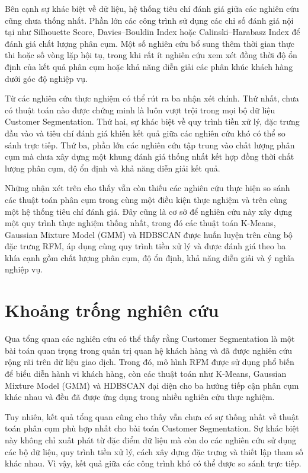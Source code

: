 \documentclass[12pt]{ai_conquer2026}
\begin{document}
Bên cạnh sự khác biệt về dữ liệu, hệ thống tiêu chí đánh giá giữa các nghiên cứu cũng chưa thống nhất. Phần lớn các công trình sử dụng các chỉ số đánh giá nội tại như Silhouette Score, Davies--Bouldin Index hoặc Calinski--Harabasz Index để đánh giá chất lượng phân cụm. Một số nghiên cứu bổ sung thêm thời gian thực thi hoặc số vòng lặp hội tụ, trong khi rất ít nghiên cứu xem xét đồng thời độ ổn định của kết quả phân cụm hoặc khả năng diễn giải các phân khúc khách hàng dưới góc độ nghiệp vụ.

Từ các nghiên cứu thực nghiệm có thể rút ra ba nhận xét chính. Thứ nhất, chưa có thuật toán nào được chứng minh là luôn vượt trội trong mọi bộ dữ liệu Customer Segmentation. Thứ hai, sự khác biệt về quy trình tiền xử lý, đặc trưng đầu vào và tiêu chí đánh giá khiến kết quả giữa các nghiên cứu khó có thể so sánh trực tiếp. Thứ ba, phần lớn các nghiên cứu tập trung vào chất lượng phân cụm mà chưa xây dựng một khung đánh giá thống nhất kết hợp đồng thời chất lượng phân cụm, độ ổn định và khả năng diễn giải kết quả.

Những nhận xét trên cho thấy vẫn còn thiếu các nghiên cứu thực hiện so sánh các thuật toán phân cụm trong cùng một điều kiện thực nghiệm và trên cùng một hệ thống tiêu chí đánh giá. Đây cũng là cơ sở để nghiên cứu này xây dựng một quy trình thực nghiệm thống nhất, trong đó các thuật toán K-Means, Gaussian Mixture Model (GMM) và HDBSCAN được huấn luyện trên cùng bộ đặc trưng RFM, áp dụng cùng quy trình tiền xử lý và được đánh giá theo ba khía cạnh gồm chất lượng phân cụm, độ ổn định, khả năng diễn giải và ý nghĩa nghiệp vụ.

\section{Khoảng trống nghiên cứu}

Qua tổng quan các nghiên cứu có thể thấy rằng Customer Segmentation là một bài toán quan trọng trong quản trị quan hệ khách hàng và đã được nghiên cứu rộng rãi trên dữ liệu giao dịch. Trong đó, mô hình RFM được sử dụng phổ biến để biểu diễn hành vi khách hàng, còn các thuật toán như K-Means, Gaussian Mixture Model (GMM) và HDBSCAN đại diện cho ba hướng tiếp cận phân cụm khác nhau và đều đã được ứng dụng trong nhiều nghiên cứu thực nghiệm.

Tuy nhiên, kết quả tổng quan cũng cho thấy vẫn chưa có sự thống nhất về thuật toán phân cụm phù hợp nhất cho bài toán Customer Segmentation. Sự khác biệt này không chỉ xuất phát từ đặc điểm dữ liệu mà còn do các nghiên cứu sử dụng các bộ dữ liệu, quy trình tiền xử lý, cách xây dựng đặc trưng và thiết lập tham số khác nhau. Vì vậy, kết quả giữa các công trình khó có thể được so sánh trực tiếp.
\end{document}
